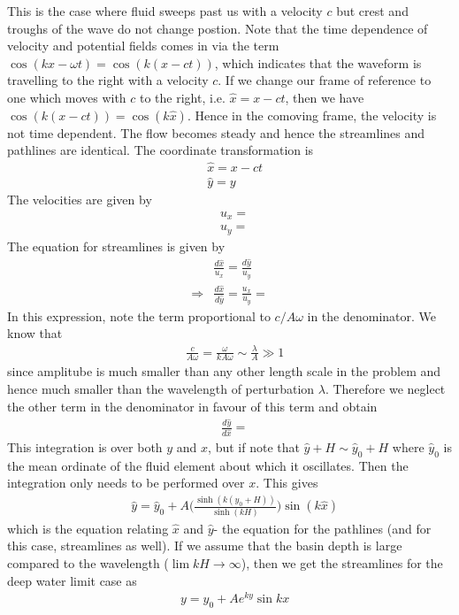 \documentclass[11pt,a4paper]{article}
\newcommand{\1}{\vect{1}}
\newcommand{\ux}{u_x}
\newcommand{\uy}{u_y}
\newcommand{\RA}{\Rightarrow}
\begin{document}
This is the case where fluid sweeps past us with a velocity $c$ but crest and troughs of the wave do not change postion. Note that the time dependence of velocity and potential fields comes in via the term $\cos(k x - \omega t) = \cos(k(x-ct))$, which indicates that the waveform is travelling to the right with a velocity $c$. If we change our frame of reference to one which moves with $c$ to the right, i.e. $\hat x = x- ct$, then we have $\cos(k(x-ct)) = \cos(k\hat x)$. Hence in the comoving frame, the velocity is not time dependent. The flow becomes steady and hence the streamlines and pathlines are identical. 
The coordinate transformation is 
\begin{align*}
&\hat x = x-ct\\
&\hat y = y
\end{align*}
The velocities are given by
\begin{align*}
&\ux = \\
&\uy = 
\end{align*}
The equation for streamlines is given by
\begin{align*}
&\frac{d\hat x}{\ux} = \frac{d\hat y}{\uy}\\
\RA&\frac{d\hat x}{d\hat y} = \frac{\ux}{\uy} = 
\end{align*}
In this expression, note the term proportional to $c/A\omega$ in the denominator. We know that
\begin{align*}
&\frac{c}{A\omega} = \frac{\omega}{k A \omega} \sim \frac{\lambda}{A} \gg 1
\end{align*}
since amplitube is much smaller than any other length scale in the problem and hence much smaller than the wavelength of perturbation $\lambda$. Therefore we neglect the other term in the denominator in favour of this term and obtain
\begin{align*}
&\frac{d\hat y}{d\hat x} = 
\end{align*}
This integration is over both $y$ and $x$, but if note that $\hat y + H \sim \hat y_0 + H$ where $\hat y_0$ is the mean ordinate of the fluid element about which it oscillates. Then the integration only needs to be performed over $x$. This gives
\begin{align*}
&\hat y = \hat y_0 + A\bigg( \frac{\sinh(k(y_0+H))}{\sinh(kH)}\bigg)\sin(k\hat x)
\end{align*}
which is the equation relating $\hat x$ and $\hat y$- the equation for the pathlines (and for this case, streamlines as well). If we assume that the basin depth is large compared to the wavelength ($\lim kH \to \infty$), then we get the streamlines for the deep water limit case as
\begin{align*}
&y= y_0 + Ae^{ky}\sin kx
\end{align*}
\end{document}

